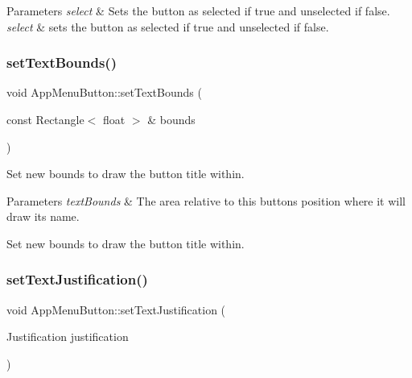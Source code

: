 \begin{DoxyParams}{Parameters}
{\em select} & Sets the button as selected if true and unselected if false.\\
\hline
{\em select} & sets the button as selected if true and unselected if false. \\
\hline
\end{DoxyParams}
\mbox{\label{classAppMenuButton_aee22a18243e83c0b5735c320d7461a8a}} 
\subsubsection{\texorpdfstring{set\+Text\+Bounds()}{setTextBounds()}}
{\footnotesize\ttfamily void App\+Menu\+Button\+::set\+Text\+Bounds (\begin{DoxyParamCaption}\item[{const Rectangle$<$ float $>$ \&}]{bounds }\end{DoxyParamCaption})\hspace{0.3cm}{\ttfamily [protected]}}

Set new bounds to draw the button title within.


\begin{DoxyParams}{Parameters}
{\em text\+Bounds} & The area relative to this button\textquotesingle{}s position where it will draw its name.\\
\hline
\end{DoxyParams}
Set new bounds to draw the button title within. \mbox{\label{classAppMenuButton_ae6fc015caaa91b9c661dce2326e03e01}} 
\subsubsection{\texorpdfstring{set\+Text\+Justification()}{setTextJustification()}}
{\footnotesize\ttfamily void App\+Menu\+Button\+::set\+Text\+Justification (\begin{DoxyParamCaption}\item[{Justification}]{justification }\end{DoxyParamCaption})\hspace{0.3cm}{\ttfamily [protected]}}

